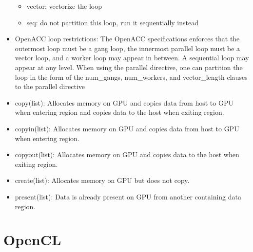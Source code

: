 \documentclass[paper=a4, fontsize=11pt]{scrartcl} %
\numberwithin{equation}{section} %
\numberwithin{figure}{section} %
\numberwithin{table}{section} %
\begin{document}
\begin{itemize}
\begin{itemize}
    \item vector: vectorize the loop
    \item seq: do not partition this loop, run it sequentially instead
  \end{itemize}
  \item OpenACC loop restrictions: The OpenACC specifications enforces that the outermost loop must be a gang loop, the innermost parallel loop must be a vector loop, and a worker loop may appear in between. A sequential loop may appear at any level. When using the parallel directive, one can partition the loop in the form of the num_gangs, num_workers, and vector_length clauses to the parallel directive
  \item copy(list): Allocates memory on GPU and copies data from host to GPU when entering region and copies data to the host when exiting region.
  \item copyin(list): Allocates memory on GPU and copies data from host to GPU when entering region.
  \item copyout(list): Allocates memory on GPU and copies data to the host when exiting region.
  \item create(list): Allocates memory on GPU but does not copy.
  \item present(list): Data is already present on GPU from another containing data region.
\end{itemize}

\section{OpenCL}
\end{document}
